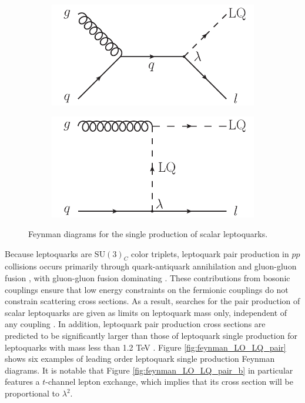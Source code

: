 \begin{figure}
  \centering
  \begin{subfigure}[b]{0.45\textwidth}
    \includegraphics[width=\textwidth]{tex/theory/fig/LO_FD_single_LQ_a}
    \caption{}
    \label{fig:feynman_LO_single_a}
  \end{subfigure}
  \begin{subfigure}[b]{0.45\textwidth}
    \includegraphics[width=\textwidth]{tex/theory/fig/LO_FD_single_LQ_b}
    \caption{}
    \label{fig:feynman_LO_single_b}
  \end{subfigure}
  \caption{Feynman diagrams for the single production of scalar leptoquarks.}
  \label{fig:feynman_LO_single}
\end{figure}

Because leptoquarks are $\text{SU}(3)_{C}$ color triplets, 
leptoquark pair production in $pp$ collisions occurs primarily
through quark-antiquark annihilation and gluon-gluon fusion
\cite{lq-vector-to-gluons,lq-scalar-hadron-colliders}, with gluon-gluon fusion dominating \cite{belyaev}.
These contributions from bosonic couplings ensure that low energy constraints
on the fermionic couplings do not constrain scattering cross sections.
As a result, searches for the pair production of scalar leptoquarks
are given as limits on leptoquark mass only, independent of any coupling
\cite{pair-lq-D0,pair-lq1-ATLAS,pair-lq2-ATLAS,pair-lq-CMS}.
In addition, leptoquark pair
production cross sections are predicted to be significantly larger
than those of leptoquark single production
for leptoquarks with mass less than 1.2 TeV \cite{belyaev}.
Figure \ref{fig:feynman_LO_LQ_pair} shows six examples of leading order leptoquark single production
Feynman diagrams.  It is notable that Figure \ref{fig:feynman_LO_LQ_pair_b} in particular
features a $t$-channel lepton exchange, which implies that its cross section will be proportional
to $\lambda^2$.

